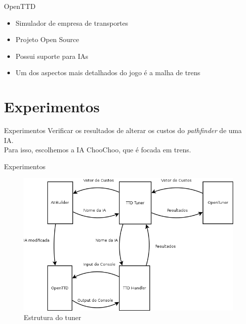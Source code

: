 \documentclass[10pt]{beamer}
\begin{document}
\begin{frame}{OpenTTD}	
	\begin{itemize}	[<+- | alert@+>]
		\item Simulador de empresa de transportes
		\item Projeto Open Source
		\item Possui suporte para IAs
		\item Um dos aspectos mais detalhados do jogo é a malha de trens
	\end{itemize}
\end{frame}

\section{Experimentos}
\begin{frame}{Experimentos}
	Verificar os resultados de alterar os custos do \textit{pathfinder} de uma IA.\pause\\
	Para isso, escolhemos a IA ChooChoo, que é focada em trens.
\end{frame}

\begin{frame}{Experimentos}
	\begin{figure}
\centering
\includegraphics[width=1\linewidth]{Diagrama1}
\caption{Estrutura do tuner}
\label{fig:Diagrama1}
\end{figure}

\end{frame}
	
\end{document}
